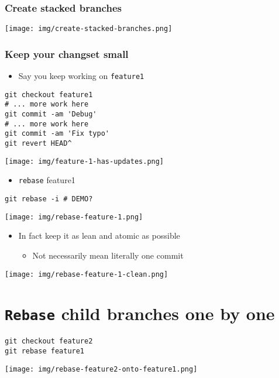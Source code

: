 \documentclass[11pt]{article}
\begin{document}
\subsubsection{Create stacked branches}
\label{sec:org2e6c077}
\begin{center}
\texttt{[image: img/create-stacked-branches.png]}
\label{orgc2226b4}
\end{center}
\subsubsection{Keep your changset small}
\label{sec:org1bd7772}
\begin{itemize}
\item Say you keep working on \texttt{feature1}
\end{itemize}
\begin{verbatim}
git checkout feature1
# ... more work here
git commit -am 'Debug'
# ... more work here
git commit -am 'Fix typo'
git revert HEAD^
\end{verbatim}

\begin{center}
\texttt{[image: img/feature-1-has-updates.png]}
\label{org25d07ff}
\end{center}

\begin{itemize}
\item \texttt{rebase} feature1
\end{itemize}
\begin{verbatim}
git rebase -i # DEMO?
\end{verbatim}
\begin{center}
\texttt{[image: img/rebase-feature-1.png]}
\label{org6221114}
\end{center}

\begin{itemize}
\item In fact keep it as lean and atomic as possible
\begin{itemize}
\item Not necessarily mean literally one commit
\end{itemize}
\end{itemize}

\begin{center}
\texttt{[image: img/rebase-feature-1-clean.png]}
\label{org52dde7f}
\end{center}
\section{\texttt{Rebase} child branches one by one}
\label{sec:org9f3a1f5}
\begin{verbatim}
git checkout feature2
git rebase feature1
\end{verbatim}
\begin{center}
\texttt{[image: img/rebase-feature2-onto-feature1.png]}
\label{org7fafbcd}
\end{center}
\end{document}
